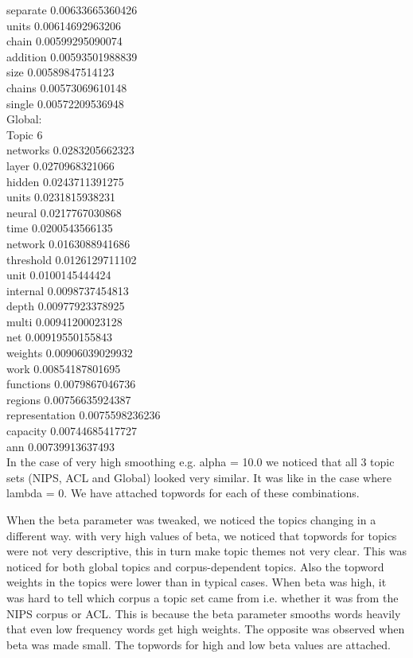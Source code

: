 \documentclass{article}
\begin{document}
separate 0.00633665360426\\
units 0.00614692963206\\
chain 0.00599295090074\\
addition 0.00593501988839\\
size 0.00589847514123\\
chains 0.00573069610148\\
single 0.00572209536948\\
Global:\\
Topic 6\\
networks 0.0283205662323\\
layer 0.0270968321066\\
hidden 0.0243711391275\\
units 0.0231815938231\\
neural 0.0217767030868\\
time 0.0200543566135\\
network 0.0163088941686\\
threshold 0.0126129711102\\
unit 0.0100145444424\\
internal 0.0098737454813\\
depth 0.00977923378925\\
multi 0.00941200023128\\
net 0.00919550155843\\
weights 0.00906039029932\\
work 0.00854187801695\\
functions 0.0079867046736\\
regions 0.00756635924387\\
representation 0.0075598236236\\
capacity 0.00744685417727\\
ann 0.00739913637493\\

In the case of very high smoothing e.g. alpha = 10.0 we noticed that all 3 topic sets (NIPS, ACL and Global) looked very similar. It was like in the case where lambda = 0.
We have attached topwords for each of these combinations.

When the beta parameter was tweaked, we noticed the topics changing in a different way. with very high values of beta, we noticed that topwords for topics were not very descriptive, this in turn make topic themes not very clear. This was noticed for both global topics and corpus-dependent topics. Also the topword weights in the topics were lower than in typical cases. When beta was high, it was hard to tell which corpus a topic set came from i.e. whether it was from the NIPS corpus or ACL. This is because the beta parameter smooths words heavily that even low frequency words get high weights. The opposite was observed when beta was made small. The topwords for high and low beta values are attached.
\end{document}
